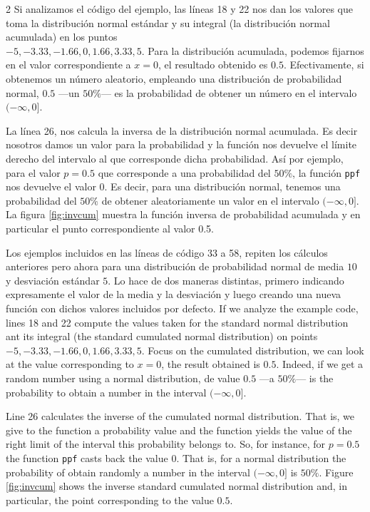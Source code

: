 \begin{paracol}{2}
Si analizamos el código del ejemplo, las líneas 18 y 22 nos dan los valores que toma la distribución normal estándar y su integral (la distribución normal acumulada) en los puntos\\ $-5,-3.33,-1.66,0,1.66,3.33,5$.
Para la distribución acumulada, podemos fijarnos en el valor correspondiente a $x=0$, el resultado obtenido es $0.5$. Efectivamente, si obtenemos un número aleatorio, empleando una distribución de probabilidad normal, $0.5$ ---un $50\%$--- es la probabilidad de obtener un número en el intervalo $(-\infty, 0]$.  

La línea 26, nos calcula la inversa de la distribución normal acumulada. Es decir nosotros damos un valor para la probabilidad y la función nos devuelve el límite derecho del intervalo al que corresponde dicha probabilidad. Así por ejemplo, para el valor $p=0.5$ que corresponde a una probabilidad del $50\%$, la función \texttt{ppf} nos devuelve el valor $0$. Es decir, para una distribución normal, tenemos una probabilidad del $50\%$ de obtener aleatoriamente un valor en el intervalo $(-\infty, 0]$. La figura \ref{fig:invcum} muestra la función inversa de probabilidad acumulada y en particular el punto  correspondiente al valor 0.5.


Los ejemplos incluidos en las líneas de código 33 a 58, repiten los cálculos anteriores pero ahora para una distribución de probabilidad normal de media $10$ y desviación estándar $5$. Lo hace de dos maneras distintas, primero indicando expresamente el valor de la media y la desviación y luego creando una nueva función con dichos valores incluidos por defecto. 
\switchcolumn
If we analyze the example code, lines 18 and 22 compute the values taken for the standard normal distribution ant its integral (the standard cumulated normal distribution) on points $-5,-3.33,-1.66,0,1.66,3.33,5$. Focus on the cumulated distribution, we can look at the value corresponding to $x=0$, the result obtained is $0.5$. Indeed, if we get a random number using a normal distribution, de value $0.5$ ---a $50\%$--- is the probability to obtain a number in the interval $(-\infty, 0]$.

Line 26 calculates the inverse of the cumulated normal distribution. That is, we give to the function a probability value and the function yields the value of the right limit of the interval this probability belongs to. So, for instance, for $p=0.5$ the function \texttt{ppf} casts back the value $0$. That is, for a normal distribution the probability of obtain randomly a number in the interval $(-\infty, 0]$ is $50\%$. Figure \ref{fig:invcum} shows the inverse standard cumulated normal distribution and, in particular, the point corresponding to the value $0.5$.


\end{paracol}
